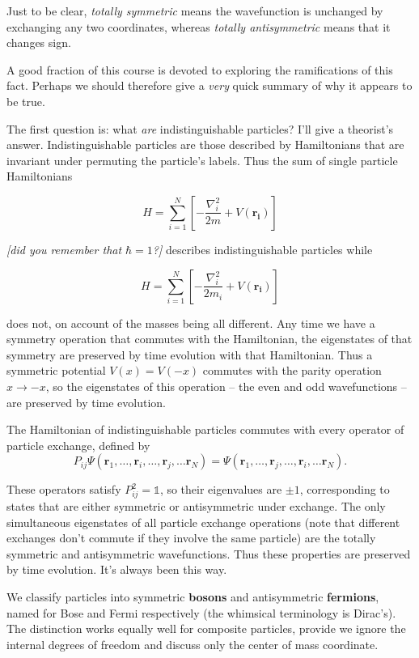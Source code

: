 \documentclass[
  a4paper,
]{scrbook}
\begin{document}
Just to be clear, \emph{totally symmetric} means the wavefunction is
unchanged by exchanging any two coordinates, whereas \emph{totally
antisymmetric} means that it changes sign.

A good fraction of this course is devoted to exploring the ramifications
of this fact. Perhaps we should therefore give a \emph{very} quick
summary of why it appears to be true.

The first question is: what \emph{are} indistinguishable particles? I'll
give a theorist's answer. Indistinguishable particles are those
described by Hamiltonians that are invariant under permuting the
particle's labels. Thus the sum of single particle Hamiltonians

\[
H = \sum_{i=1}^{N} \left[-\frac{\nabla_i^{2}}{2m}+V(\mathbf{r_i})\right]
\]

\emph{{[}did you remember that \(\hbar=1\)?{]}} describes
indistinguishable particles while

\[
H = \sum_{i=1}^{N} \left[-\frac{\nabla_i^{2}}{2m_i}+V(\mathbf{r_i})\right]
\]

does not, on account of the masses being all different. Any time we have
a symmetry operation that commutes with the Hamiltonian, the eigenstates
of that symmetry are preserved by time evolution with that Hamiltonian.
Thus a symmetric potential \(V(x)=V(-x)\) commutes with the parity
operation \(x\to -x\), so the eigenstates of this operation -- the even
and odd wavefunctions -- are preserved by time evolution.

The Hamiltonian of indistinguishable particles commutes with every
operator of particle exchange, defined by \[
P_{ij}\Psi(\mathbf{r}_1,\ldots, \mathbf{r}_i,\ldots, \mathbf{r}_j,\ldots \mathbf{r}_N) = \Psi(\mathbf{r}_1,\ldots, \mathbf{r}_j,\ldots, \mathbf{r}_i,\ldots \mathbf{r}_N).
\]

These operators satisfy \(P_{ij}^2=\mathbb{1}\), so their eigenvalues
are \(\pm 1\), corresponding to states that are either symmetric or
antisymmetric under exchange. The only simultaneous eigenstates of all
particle exchange operations (note that different exchanges don't
commute if they involve the same particle) are the totally symmetric and
antisymmetric wavefunctions. Thus these properties are preserved by time
evolution. It's always been this way.

We classify particles into symmetric \textbf{bosons} and antisymmetric
\textbf{fermions}, named for Bose and Fermi respectively (the whimsical
terminology is Dirac's). The distinction works equally well for
composite particles, provide we ignore the internal degrees of freedom
and discuss only the center of mass coordinate.
\end{document}
